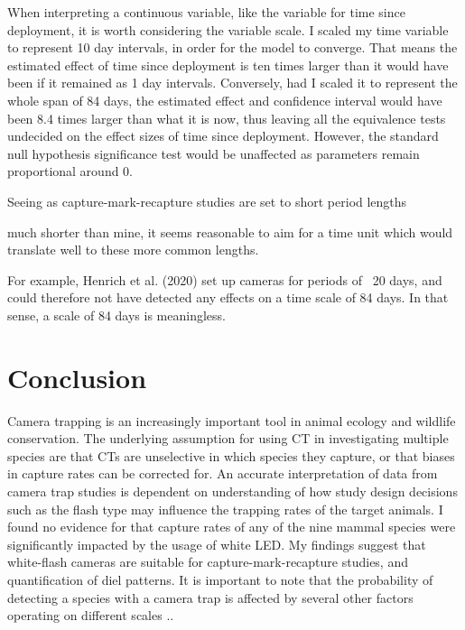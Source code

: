 When interpreting a continuous variable, like the variable for time since deployment, it is worth considering the variable scale. 
I scaled my time variable to represent 10 day intervals, in order for the model to converge. That means the estimated effect of time since deployment is ten times larger than it would have been if it remained as 1 day intervals.
Conversely, had I scaled it to represent the whole span of 84 days, the estimated effect and confidence interval would have been 8.4 times larger than what it is now, thus leaving all the equivalence tests undecided on the effect sizes of time since deployment.
However, the standard null hypothesis significance test would be unaffected as parameters remain proportional around 0. %

Seeing as capture-mark-recapture studies are set to short period lengths

much shorter than mine, it seems reasonable to aim for a time unit which would translate well to these more common lengths.

For example, Henrich et al. (2020) set up cameras for periods of ~20 days, %
and could therefore not have detected any effects on a time scale of 84 days.
In that sense, a scale of 84 days is meaningless.




\chapter{Conclusion}
Camera trapping is an increasingly important tool in animal ecology and wildlife conservation. The underlying assumption for using CT in investigating multiple species are that CTs are unselective in which species they capture, or that biases in capture rates can be corrected for. An accurate interpretation of data from camera trap studies is dependent on understanding of how study design decisions such as the flash type may influence the trapping rates of the target animals.  I found no evidence for that capture rates of any of the nine mammal species were significantly impacted by the usage of white LED. My findings suggest that white-flash cameras are suitable for capture-mark-recapture studies, and quantification of diel patterns. 
It is important to note that the probability of detecting a species with a camera trap is affected by several other factors operating on different scales ..

